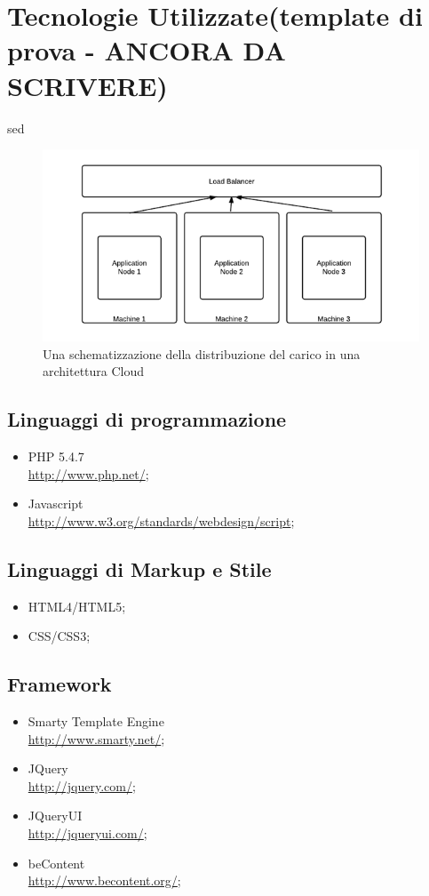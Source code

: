 \chapter{Tecnologie Utilizzate(template di prova - ANCORA DA SCRIVERE)}

sed

\begin{figure}[h!]
	\centering
	\includegraphics[width=\textwidth,keepaspectratio=true]{capitoli/imgs/LoadBalancer.png}
	\caption{Una schematizzazione della distribuzione del carico in una architettura Cloud}
\end{figure}


  \section{Linguaggi di programmazione}
    \begin{itemize}
     \item PHP 5.4.7 \\
     \href{http://www.php.net/}{http://www.php.net/};
     \item Javascript \\
     \href{http://www.w3.org/standards/webdesign/script}{http://www.w3.org/standards/webdesign/script};
    \end{itemize}
   \section{Linguaggi di Markup e Stile}
    \begin{itemize}
     \item HTML4/HTML5;
     \item CSS/CSS3;
    \end{itemize}
   \section{Framework}
    \begin{itemize}
     \item Smarty Template Engine \\
	\href{http://www.smarty.net/}{http://www.smarty.net/};
     \item JQuery\\
	\href{http://jquery.com/}{http://jquery.com/};
     \item JQueryUI\\
	\href{http://jqueryui.com/}{http://jqueryui.com/};
     \item beContent\\
	\href{http://www.becontent.org/}{http://www.becontent.org/};
    \end{itemize}
